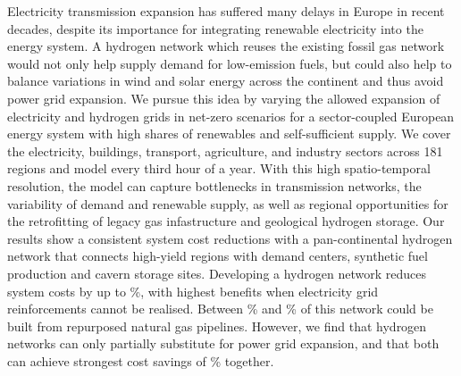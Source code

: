 Electricity transmission expansion has suffered many delays in Europe in recent
decades, despite its importance for integrating renewable electricity into the
energy system. A hydrogen network which reuses the existing fossil gas network
would not only help supply demand for low-emission fuels, but could also help to
balance variations in wind and solar energy across the continent and thus avoid
power grid expansion. We pursue this idea by varying the allowed expansion of
electricity and hydrogen grids in net-zero \co scenarios for a sector-coupled
European energy system with high shares of renewables and self-sufficient
supply. We cover the electricity, buildings, transport, agriculture, and
industry sectors across 181 regions and model every third hour of a year. With
this high spatio-temporal resolution, the model can capture bottlenecks in
transmission networks, the variability of demand and renewable supply, as well
as regional opportunities for the retrofitting of legacy gas infastructure and
geological hydrogen storage. Our results show a consistent system cost reductions with a
pan-continental hydrogen network that connects high-yield regions with demand
centers, synthetic fuel production and cavern storage sites. Developing a
hydrogen network reduces system costs by up to \maxhybenefitrel\%, with highest benefits when
electricity grid reinforcements cannot be realised. Between \minretroshare\% and \maxretroshare\% of
this network could be built from repurposed natural gas pipelines. However, we
find that hydrogen networks can only partially substitute for power grid
expansion, and that both can achieve strongest cost savings of \gridbenefitrel\% together.
